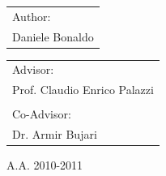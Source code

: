 \begin{titlepage}
    \begin{tabular}{l}
        Author:\\
        Daniele Bonaldo\\
    \end{tabular}
    \hfill
    \begin{tabular}{l}
        Advisor:\\
        Prof. Claudio Enrico Palazzi\\
        \\                                      %
        Co-Advisor:\\
        Dr. Armir Bujari 
    \end{tabular}
    \vfill
    \vspace{1cm}
        \begin{center}
            A.A. 2010-2011 \\
        \end{center}
\end{titlepage}

\clearpage{\pagestyle{empty}\cleardoublepage}
